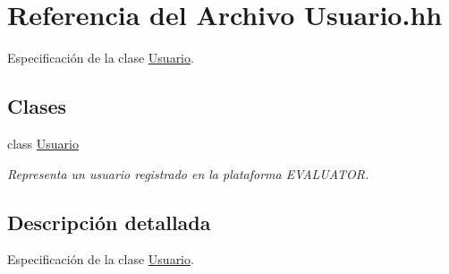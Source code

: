 \hypertarget{_usuario_8hh}{}\section{Referencia del Archivo Usuario.\+hh}
\label{_usuario_8hh}


Especificación de la clase \mbox{\hyperlink{class_usuario}{Usuario}}.  


\subsection*{Clases}
\begin{DoxyCompactItemize}
\item 
class \mbox{\hyperlink{class_usuario}{Usuario}}
\begin{DoxyCompactList}\small\item\em Representa un usuario registrado en la plataforma E\+V\+A\+L\+U\+A\+T\+OR. \end{DoxyCompactList}\end{DoxyCompactItemize}


\subsection{Descripción detallada}
Especificación de la clase \mbox{\hyperlink{class_usuario}{Usuario}}. 

